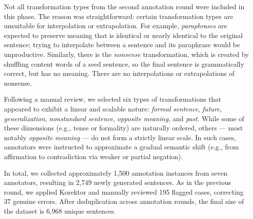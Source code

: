 Not all transformation types from the second annotation round were included in this phase. The reason was straightforward: certain transformation types are unsuitable for interpolation or extrapolation. For example, \textit{paraphrases} are expected to preserve meaning that is identical or nearly identical to the original sentence; trying to interpolate between a sentence and its paraphrase would be unproductive. Similarly, there is the \textit{nonsense} transformation, which is created by shuffling content words of a seed sentence, so the final sentence is grammatically correct, but has no meaning. There are no interpolations or extrapolations of nonsense.

Following a manual review, we selected six types of transformations that appeared to exhibit a linear and scalable nature: \textit{formal sentence}, \textit{future}, \textit{generalization}, \textit{nonstandard sentence}, \textit{opposite meaning}, and \textit{past}.  While some of these dimensions (e.g., tense or formality) are naturally ordered, others --- most notably \textit{opposite meaning} --- do not form a strictly linear scale. In such cases, annotators were instructed to approximate a gradual semantic shift (e.g., from affirmation to contradiction via weaker or partial negation).

In total, we collected approximately 1,500 annotation instances from seven annotators, resulting in 2,749 newly generated sentences. As in the previous round, we applied Korektor and manually reviewed 195 flagged cases, correcting 37 genuine errors. After deduplication across annotation rounds, the final size of the \costra dataset is 6,968 unique sentences.


